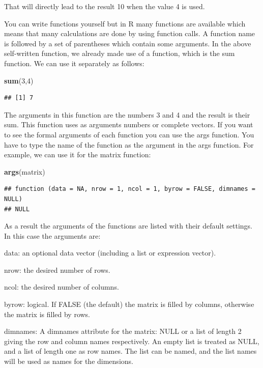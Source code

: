 \documentclass[]{book}
\newenvironment{Shaded}{\begin{snugshade}}{\end{snugshade}}
\newcommand{\KeywordTok}[1]{\textcolor[rgb]{0.13,0.29,0.53}{\textbf{#1}}}
\newcommand{\DecValTok}[1]{\textcolor[rgb]{0.00,0.00,0.81}{#1}}
\newcommand{\NormalTok}[1]{#1}
\begin{document}
That will directly lead to the result 10 when the value 4 is used.

You can write functions yourself but in R many functions are available
which means that many calculations are done by using function calls. A
function name is followed by a set of parentheses which contain some
arguments. In the above self-written function, we already made use of a
function, which is the sum function. We can use it separately as
follows:

\begin{Shaded}
\begin{Highlighting}[]
\KeywordTok{sum}\NormalTok{(}\DecValTok{3}\NormalTok{,}\DecValTok{4}\NormalTok{)}
\end{Highlighting}
\end{Shaded}

\begin{verbatim}
## [1] 7
\end{verbatim}

The arguments in this function are the numbers 3 and 4 and the result is
their sum. This function uses as arguments numbers or complete vectors.
If you want to see the formal arguments of each function you can use the
args function. You have to type the name of the function as the argument
in the args function. For example, we can use it for the matrix
function:

\begin{Shaded}
\begin{Highlighting}[]
\KeywordTok{args}\NormalTok{(matrix)}
\end{Highlighting}
\end{Shaded}

\begin{verbatim}
## function (data = NA, nrow = 1, ncol = 1, byrow = FALSE, dimnames = NULL) 
## NULL
\end{verbatim}

As a result the arguments of the functions are listed with their default
settings. In this case the arguments are:

data: an optional data vector (including a list or expression vector).

nrow: the desired number of rows.

ncol: the desired number of columns.

byrow: logical. If FALSE (the default) the matrix is filled by columns,
otherwise the matrix is filled by rows.

dimnames: A dimnames attribute for the matrix: NULL or a list of length
2 giving the row and column names respectively. An empty list is treated
as NULL, and a list of length one as row names. The list can be named,
and the list names will be used as names for the dimensions.
\end{document}
